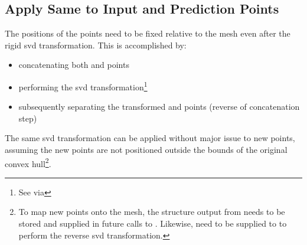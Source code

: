 \documentclass[final,12pt]{elsarticle}
\begin{document}
\subsection{Apply Same  to Input and Prediction Points}
\label{sec:app:bary:int:out-svd}
The positions of the \outpt{} points need to be fixed relative to the mesh even after the rigid \gls{svd} transformation. %
This is accomplished by:
\begin{itemize}%
	\item[2.1a] concatenating both \inpt{} and
	\outpt{} points
	\item[2.1b] performing the \gls{svd} transformation\footnote{See   via }
	\item[2.1c] subsequently separating the transformed \inpt{} and \outpt{} points (reverse of concatenation step)
\end{itemize}
%
The same \gls{svd} transformation can be applied without major issue to new points, assuming the new points are not positioned outside the bounds of the original convex hull\footnote{To map new points onto the mesh, the  structure output from  needs to be stored and supplied in future calls to . Likewise,  need to be supplied to  to perform the reverse \gls{svd} transformation.}.
%
\end{document}
